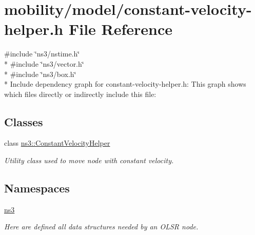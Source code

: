 \hypertarget{constant-velocity-helper_8h}{}\section{mobility/model/constant-\/velocity-\/helper.h File Reference}
\label{constant-velocity-helper_8h}
{\ttfamily \#include \char`\"{}ns3/nstime.\+h\char`\"{}}\\*
{\ttfamily \#include \char`\"{}ns3/vector.\+h\char`\"{}}\\*
{\ttfamily \#include \char`\"{}ns3/box.\+h\char`\"{}}\\*
Include dependency graph for constant-\/velocity-\/helper.h\+:
This graph shows which files directly or indirectly include this file\+:
\subsection*{Classes}
\begin{DoxyCompactItemize}
\item 
class \hyperlink{classns3_1_1ConstantVelocityHelper}{ns3\+::\+Constant\+Velocity\+Helper}
\begin{DoxyCompactList}\small\item\em Utility class used to move node with constant velocity. \end{DoxyCompactList}\end{DoxyCompactItemize}
\subsection*{Namespaces}
\begin{DoxyCompactItemize}
\item 
 \hyperlink{namespacens3}{ns3}
\begin{DoxyCompactList}\small\item\em Here are defined all data structures needed by an O\+L\+SR node. \end{DoxyCompactList}\end{DoxyCompactItemize}
